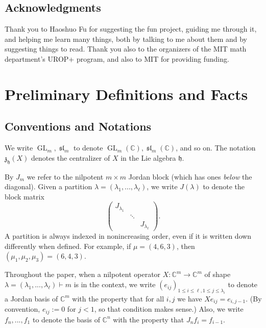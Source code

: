 \documentclass[12pt,psamsfonts]{article}
\DeclareMathOperator{\GL}{GL}
\DeclareMathOperator{\spl}{\mathfrak{sl}}
\begin{document}
\subsection{Acknowledgments}
Thank you to Haoshuo Fu for suggesting the fun project, guiding me through it, and helping me learn many things, both by talking to me about them and by suggesting things to read.
Thank you also to the organizers of the MIT math department's UROP+ program, and also to MIT for providing funding.

\section{Preliminary Definitions and Facts}\label{prelim}
\subsection{Conventions and Notations}
We write \(\GL_m, \spl_m\) to denote \(\GL_m(\mathbb{C}), \spl_m(\mathbb{C})\), and so on.
The notation \(\mathfrak{z}_\mathfrak{h}(X)\) denotes the centralizer of \(X\) in the Lie algebra \(\mathfrak{h}\).
\par By \(J_m\) we refer to the nilpotent \(m \times m\) Jordan block (which has ones \emph{below} the diagonal).
Given a partition \(\lambda = (\lambda_1, ..., \lambda_\ell)\), we write \(J(\lambda)\) to denote the block matrix
\[\begin{pmatrix}
    J_{\lambda_1} \\
    & \ddots \\
    & & J_{\lambda_\ell}
\end{pmatrix}.\]
A partition is always indexed in nonincreasing order, even if it is written down differently when defined.
For example, if \(\mu = (4, 6, 3)\), then \((\mu_1, \mu_2, \mu_3) = (6, 4, 3)\).
\par Throughout the paper, when a nilpotent operator \(X : \mathbb{C}^m \to \mathbb{C}^m\) of shape \(\lambda = (\lambda_1, ..., \lambda_\ell) \vdash m\) is in the context, we write \((e_{ij})_{1 \leq i \leq \ell, 1 \leq j \leq \lambda_i}\) to denote a Jordan basis of \(\mathbb{C}^m\) with the property that for all \(i,j\) we have \(Xe_{ij} = e_{i,j - 1}\).
(By convention, \(e_{ij} := 0\) for \(j < 1\), so that condition makes sense.)
Also, we write \(f_n, ..., f_1\) to denote the basis of \(\mathbb{C}^n\) with the property that \(J_n f_i = f_{i - 1}\).
\end{document}
